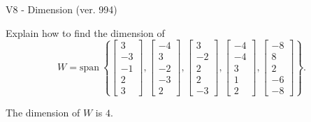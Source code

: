 \begin{exercise}
  \begin{exerciseTitle}V8 - Dimension (ver. 994)\end{exerciseTitle}
  \begin{exerciseStatement}
    Explain how to find the dimension of 
\[W=\mathrm{span}\ \left\{\left[\begin{array}{r}
3 \\
-3 \\
-1 \\
2 \\
3
\end{array}\right] , \left[\begin{array}{r}
-4 \\
3 \\
-2 \\
-3 \\
2
\end{array}\right] , \left[\begin{array}{r}
3 \\
-2 \\
2 \\
2 \\
-3
\end{array}\right] , \left[\begin{array}{r}
-4 \\
-4 \\
3 \\
1 \\
2
\end{array}\right] , \left[\begin{array}{r}
-8 \\
8 \\
2 \\
-6 \\
-8
\end{array}\right]\right\}.\]



  \end{exerciseStatement}
  \begin{exerciseAnswer}
   The dimension of \(W\) is  \(4\).
  


  \end{exerciseAnswer}
\end{exercise}